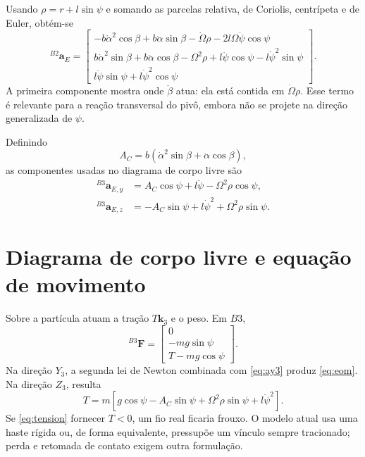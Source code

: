 \documentclass[11pt,a4paper]{article}
\newcommand{\bvec}[1]{\bm{#1}}
\newcommand{\vct}[2]{{}^{#1}\!\bvec{#2}}
\begin{document}
Usando $\rho=r+l\sin\psi$ e somando as parcelas relativa, de Coriolis,
centrípeta e de Euler, obtém-se
\begin{equation}
\vct{B2}{a}_E=
\begin{bmatrix}
-b\dot\alpha^2\cos\beta+b\ddot\alpha\sin\beta
-\dot\Omega\rho-2l\Omega\dot\psi\cos\psi\\
b\dot\alpha^2\sin\beta+b\ddot\alpha\cos\beta-\Omega^2\rho
+l\ddot\psi\cos\psi-l\dot\psi^2\sin\psi\\
l\ddot\psi\sin\psi+l\dot\psi^2\cos\psi
\end{bmatrix}.
\label{eq:acceleration-b2}
\end{equation}
A primeira componente mostra onde $\ddot\beta$ atua: ela está contida em
$\dot\Omega\rho$. Esse termo é relevante para a reação transversal do pivô,
embora não se projete na direção generalizada de $\psi$.

Definindo
\begin{equation}
A_C=b\left(\dot\alpha^2\sin\beta+\ddot\alpha\cos\beta\right),
\label{eq:arm-acceleration}
\end{equation}
as componentes usadas no diagrama de corpo livre são
\begin{align}
\vct{B3}{a}_{E,y}&=A_C\cos\psi+l\ddot\psi
-\Omega^2\rho\cos\psi,\label{eq:ay3}\\
\vct{B3}{a}_{E,z}&=-A_C\sin\psi+l\dot\psi^2
+\Omega^2\rho\sin\psi.\label{eq:az3}
\end{align}
\section{Diagrama de corpo livre e equação de movimento}

Sobre a partícula atuam a tração $T\bvec k_3$ e o peso. Em $B3$,
\begin{equation}
\vct{B3}{F}=
\begin{bmatrix}0\\-mg\sin\psi\\T-mg\cos\psi\end{bmatrix}.
\end{equation}
Na direção $Y_3$, a segunda lei de Newton combinada com \cref{eq:ay3} produz
\cref{eq:eom}. Na direção $Z_3$, resulta
\begin{equation}
\boxed{T=m\left[g\cos\psi-A_C\sin\psi
+\Omega^2\rho\sin\psi+l\dot\psi^2\right].}
\label{eq:tension}
\end{equation}
Se \cref{eq:tension} fornecer $T<0$, um fio real ficaria frouxo. O modelo atual
usa uma haste rígida ou, de forma equivalente, pressupõe um vínculo sempre
tracionado; perda e retomada de contato exigem outra formulação.
\end{document}
